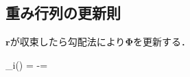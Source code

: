 \subsection{重み行列の更新則}
$\mathbf{r}$が収束したら勾配法により$\mathbf{\Phi}$を更新する．


\Delta \phi_i() = -\eta {}=\eta\cdot\left[\left([\mathbf{x}-\mathbf{\Phi}\mathbf{r}\right)\mathbf{r}^\top\right]
